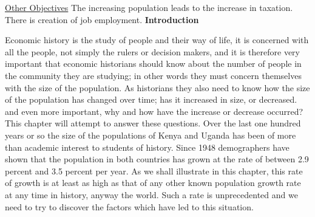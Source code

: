 \documentclass[10pt,a4paper]{article}
\begin{document}
\underline{Other Objectives}\newline
The increasing population leads to the increase in taxation.\newline
There is creation of job employment.\newline
\textbf{Introduction}\newline
\begin{flushleft}
Economic history is the study of people and their way of life, it is concerned with all the people, not simply the rulers or decision makers, and it is therefore very important that economic historians  should know about the number of people in the community they are studying; in other words they must concern themselves with the size of the population. As historians they also need to know how the size of the population has changed over time; has it increased in size, or decreased. and even more important, why and how have the increase or decrease occurred? This chapter will attempt to answer these questions. Over the last one hundred years  or so the size of the populations of Kenya and Uganda has been of more than academic interest to students of history. Since 1948 demographers have shown that the population in both countries has grown at the rate of between 2.9 percent and 3.5 percent per year. As we shall illustrate in this chapter, this rate of growth is at least as high as that of any other known population growth rate at any time in history, anyway the world. Such a rate is unprecedented and we need to try to discover the factors which have led to this situation.\newline
\end{flushleft}
\end{document}
